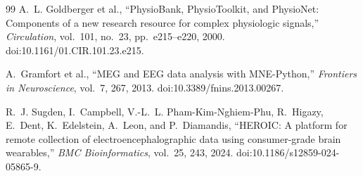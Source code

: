 \documentclass[11pt,a4paper]{article}
\begin{document}
\begin{thebibliography}{99}
A.~L. Goldberger et al., ``PhysioBank, PhysioToolkit, and PhysioNet: Components of a new
research resource for complex physiologic signals,'' \emph{Circulation}, vol.~101, no.~23,
pp.~e215--e220, 2000. doi:10.1161/01.CIR.101.23.e215.

A.~Gramfort et al., ``MEG and EEG data analysis with MNE-Python,'' \emph{Frontiers in
Neuroscience}, vol.~7, 267, 2013. doi:10.3389/fnins.2013.00267.

R.~J. Sugden, I.~Campbell, V.-L.~L. Pham-Kim-Nghiem-Phu, R.~Higazy, E.~Dent, K.~Edelstein,
A.~Leon, and P.~Diamandis, ``HEROIC: A platform for remote collection of
electroencephalographic data using consumer-grade brain wearables,'' \emph{BMC
Bioinformatics}, vol.~25, 243, 2024. doi:10.1186/s12859-024-05865-9.

\end{thebibliography}
\end{document}
